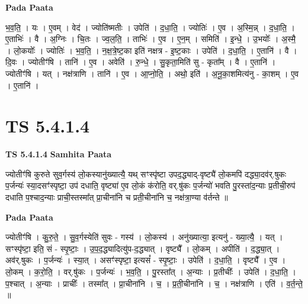 \documentclass[17pt]{extarticle}
\begin{document}
\textbf{Pada Paata} \newline

भ॒व॒ति॒ । यः । ए॒वम् । वेद॑ । ज्योति॑ष्मतीः । उपेति॑ । द॒धा॒ति॒ । ज्योतिः॑ । ए॒व । अ॒स्मि॒न्न् । द॒धा॒ति॒ । ए॒ताभिः॑ । वै । अ॒ग्निः । चि॒तः । ज्व॒ल॒ति॒ । ताभिः॑ । ए॒व । ए॒न॒म् । समिति॑ । इ॒न्धे॒ । उ॒भयोः᳚ । अ॒स्मै॒ । लो॒कयोः᳚ । ज्योतिः॑ । भ॒व॒ति॒ । न॒क्ष॒त्रे॒ष्ट॒का इति॑ नक्षत्र - इ॒ष्ट॒काः । उपेति॑ । द॒धा॒ति॒ । ए॒तानि॑ । वै । दि॒वः । ज्योतीꣳ॑षि । तानि॑ । ए॒व । अवेति॑ । रु॒न्धे॒ । सु॒कृता॒मिति॑ सु - कृता᳚म् । वै । ए॒तानि॑ । ज्योतीꣳ॑षि । यत् । नक्ष॑त्राणि । तानि॑ । ए॒व । आ॒प्नो॒ति॒ । अथो॒ इति॑ । अ॒नू॒का॒शमित्य॑नु - का॒शम् । ए॒व । ए॒तानि॑ ।  \newline





\section{ TS 5.4.1.4 }

\textbf{TS 5.4.1.4 } \newline
\textbf{Samhita Paata} \newline

ज्योतीꣳ॑षि कुरुते सुव॒र्गस्य॑ लो॒कस्यानु॑ख्यात्यै॒ यथ् सꣳस्पृ॑ष्टा उपद॒द्ध्याद्-वृष्ट्यै॑ लो॒कमपि॑ दद्ध्या॒दव॑र्.षुकः प॒र्जन्यः॑ स्या॒दसꣳ॑स्पृष्टा॒ उप॑ दधाति॒ वृष्ट्या॑ ए॒व लो॒कं क॑रोति॒ वर्.षु॑कः प॒र्जन्यो॑ भवति पु॒रस्ता॑द॒न्याः प्र॒तीची॒रुप॑ दधाति प॒श्चाद॒न्याः प्राची॒स्तस्मा᳚त् प्रा॒चीना॑नि च प्रती॒चीना॑नि च॒ नक्ष॑त्रा॒ण्या व॑र्तन्ते ॥ \newline

\textbf{Pada Paata} \newline

ज्योतीꣳ॑षि । कु॒रु॒ते॒ । सु॒व॒र्गस्येति॑ सुवः - गस्य॑ । लो॒कस्य॑ । अनु॑ख्यात्या॒ इत्यनु॑ - ख्या॒त्यै॒ । यत् । सꣳस्पृ॑ष्टा॒ इति॒ सं - स्पृ॒ष्टाः॒ । उ॒प॒द॒द्ध्यादित्यु॑प-द॒द्ध्यात् । वृष्ट्यै᳚ । लो॒कम् । अपीति॑ । द॒द्ध्या॒त् । अव॑र्.षुकः । प॒र्जन्यः॑ । स्या॒त् । असꣳ॑स्पृष्टा॒ इत्यसं᳚ - स्पृ॒ष्टाः॒ । उपेति॑ । द॒धा॒ति॒ । वृष्ट्यै᳚ । ए॒व । लो॒कम् । क॒रो॒ति॒ । वर्.षु॑कः । प॒र्जन्यः॑ । भ॒व॒ति॒ । पु॒रस्ता᳚त् । अ॒न्याः । प्र॒तीचीः᳚ । उपेति॑ । द॒धा॒ति॒ । प॒श्चात् । अ॒न्याः । प्राचीः᳚ । तस्मा᳚त् । प्रा॒चीना॑नि । च॒ । प्र॒ती॒चीना॑नि । च॒ । नक्ष॑त्राणि । एति॑ । व॒र्त॒न्ते॒ ॥  \newline




\end{document}
